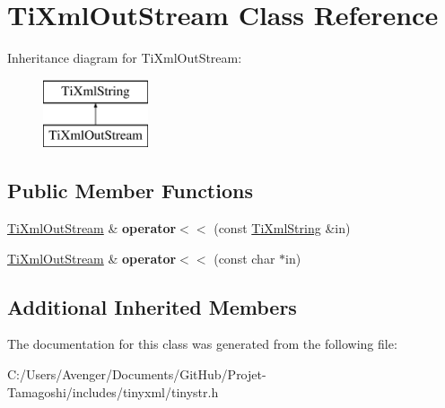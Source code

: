 \hypertarget{class_ti_xml_out_stream}{\section{Ti\+Xml\+Out\+Stream Class Reference}
\label{class_ti_xml_out_stream}
}
Inheritance diagram for Ti\+Xml\+Out\+Stream\+:\begin{figure}[H]
\begin{center}
\leavevmode
\includegraphics[height=2.000000cm]{class_ti_xml_out_stream}
\end{center}
\end{figure}
\subsection*{Public Member Functions}
\begin{DoxyCompactItemize}
\item 
\hypertarget{class_ti_xml_out_stream_a3640dcb1c0903be3bc6966cdc9a79db6}{\hyperlink{class_ti_xml_out_stream}{Ti\+Xml\+Out\+Stream} \& {\bfseries operator$<$$<$} (const \hyperlink{class_ti_xml_string}{Ti\+Xml\+String} \&in)}\label{class_ti_xml_out_stream_a3640dcb1c0903be3bc6966cdc9a79db6}

\item 
\hypertarget{class_ti_xml_out_stream_af2117e5a8cbfcb69544804ad2859bfb6}{\hyperlink{class_ti_xml_out_stream}{Ti\+Xml\+Out\+Stream} \& {\bfseries operator$<$$<$} (const char $\ast$in)}\label{class_ti_xml_out_stream_af2117e5a8cbfcb69544804ad2859bfb6}

\end{DoxyCompactItemize}
\subsection*{Additional Inherited Members}


The documentation for this class was generated from the following file\+:\begin{DoxyCompactItemize}
\item 
C\+:/\+Users/\+Avenger/\+Documents/\+Git\+Hub/\+Projet-\/\+Tamagoshi/includes/tinyxml/tinystr.\+h\end{DoxyCompactItemize}
